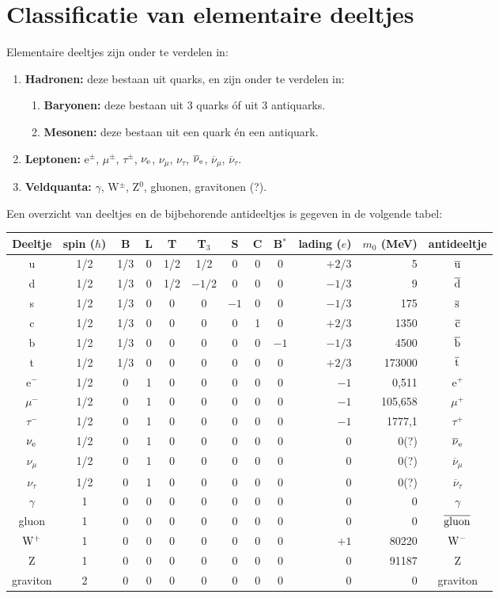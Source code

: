 \section[~~Classificatie van elementaire deeltjes]{Classificatie van elementaire deeltjes}
Elementaire deeltjes zijn onder te verdelen in:
\begin{enumerate}
\item {\bf Hadronen:} deze bestaan uit quarks, en zijn onder te verdelen in:
      \begin{enumerate}
      \item {\bf Baryonen:} deze bestaan uit 3 quarks \'of uit 3 antiquarks.
      \item {\bf Mesonen:} deze bestaan uit een quark \'en een antiquark.
      \end{enumerate}
\item {\bf Leptonen:} e$^\pm$, $\mu^\pm$, $\tau^\pm$, $\nu_{\rm e}$, $\nu_\mu$, $\nu_\tau$,
      $\overline{\nu}_{\rm e}$, $\overline{\nu}_\mu$, $\overline{\nu}_\tau$.
\item {\bf Veldquanta:} $\gamma$, W$^\pm$, Z$^0$, gluonen, gravitonen (?).
\end{enumerate}
Een overzicht van deeltjes en de bijbehorende antideeltjes is gegeven in de
volgende tabel:
\begin{center}
\begin{tabular}{||c|c@{}cccccccrr|c||}
\hline
Deeltje&spin ($\hbar$)&B&L&T&T$_3$&S&C&B$^*$&lading ($e$)&$m_0$ (MeV)&antideeltje\\
\hline
\hline
u&1/2&1/3&0&1/2&1/2   &0 &0 &0&$+2/3$&   5&$\overline{\rm u}$\\
d&1/2&1/3&0&1/2&$-1/2$&0 &0 &0&$-1/3$&   9&$\overline{\rm d}$\\
s&1/2&1/3&0&  0&0&$-1$&0 &0 &$-1/3$&   175&$\overline{\rm s}$\\
c&1/2&1/3&0&  0&0&0 &1 &0   &$+2/3$&  1350&$\overline{\rm c}$\\
b&1/2&1/3&0&  0&0&0 &0 &$-1$&$-1/3$&  4500&$\overline{\rm b}$\\
t&1/2&1/3&0&  0&0&0 &0 &0   &$+2/3$&173000&$\overline{\rm t}$\\
\hline
e$^-$        &1/2&0&1&0&0&0&0&0&$-1$&0,511&e$^+$\\
$\mu^-$      &1/2&0&1&0&0&0&0&0&$-1$&105,658&$\mu^+$\\
$\tau^-$     &1/2&0&1&0&0&0&0&0&$-1$&1777,1&$\tau^+$\\
$\nu_{\rm e}$&1/2&0&1&0&0&0&0&0&0&0(?)&$\overline{\nu}_{\rm e}$\\
$\nu_\mu$    &1/2&0&1&0&0&0&0&0&0&0(?)&$\overline{\nu}_{\mu}$\\
$\nu_\tau$   &1/2&0&1&0&0&0&0&0&0&0(?)&$\overline{\nu}_{\tau}$\\
\hline
$\gamma$ &1&0&0&0&0&0&0&0&$0$&0&$\gamma$\\
gluon    &1&0&0&0&0&0&0&0&$0$&0&$\overline{\rm gluon}$\\
$\rm W^+$&1&0&0&0&0&0&0&0&$+1$&80220&$\rm W^-$\\
Z        &1&0&0&0&0&0&0&0&$0$&91187&Z\\
graviton &2&0&0&0&0&0&0&0&$0$&0&graviton\\
\hline
\end{tabular}
\end{center}
